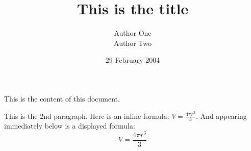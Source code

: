 \documentclass[12pt]{article}
\title{This is the title}
\author{Author One \\ Author Two}
\date{29 February 2004}
\begin{document}
\maketitle

This is the content of this document.

This is the 2nd paragraph.
Here is an inline formula:
$   V = \frac{4 \pi r^3}{3}  $.
And appearing immediately below
is a displayed formula:
$$  V = \frac{4 \pi r^3}{3}  $$
\end{document}
